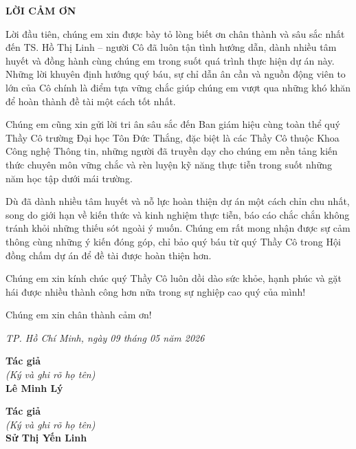 \newpage
\begin{center}
{\fontsize{16pt}{19.2pt}\selectfont \textbf{LỜI CẢM ƠN}\par}
\end{center}
\vspace{0.5cm}

Lời đầu tiên, chúng em xin được bày tỏ lòng biết ơn chân thành và sâu sắc nhất đến TS. Hồ Thị Linh – người Cô đã luôn tận tình hướng dẫn, dành nhiều tâm huyết và đồng hành cùng chúng em trong suốt quá trình thực hiện dự án này. Những lời khuyên định hướng quý báu, sự chỉ dẫn ân cần và nguồn động viên to lớn của Cô chính là điểm tựa vững chắc giúp chúng em vượt qua những khó khăn để hoàn thành đề tài một cách tốt nhất.

Chúng em cũng xin gửi lời tri ân sâu sắc đến Ban giám hiệu cùng toàn thể quý Thầy Cô trường Đại học Tôn Đức Thắng, đặc biệt là các Thầy Cô thuộc Khoa Công nghệ Thông tin, những người đã truyền dạy cho chúng em nền tảng kiến thức chuyên môn vững chắc và rèn luyện kỹ năng thực tiễn trong suốt những năm học tập dưới mái trường.

Dù đã dành nhiều tâm huyết và nỗ lực hoàn thiện dự án một cách chỉn chu nhất, song do giới hạn về kiến thức và kinh nghiệm thực tiễn, báo cáo chắc chắn không tránh khỏi những thiếu sót ngoài ý muốn. Chúng em rất mong nhận được sự cảm thông cùng những ý kiến đóng góp, chỉ bảo quý báu từ quý Thầy Cô trong Hội đồng chấm dự án để đề tài được hoàn thiện hơn.

Chúng em xin kính chúc quý Thầy Cô luôn dồi dào sức khỏe, hạnh phúc và gặt hái được nhiều thành công hơn nữa trong sự nghiệp cao quý của mình!

Chúng em xin chân thành cảm ơn!

\vspace{0.8cm}

\begin{flushright}
\textit{TP. Hồ Chí Minh, ngày 09 tháng 05 năm 2026}
\end{flushright}

\vspace{0.3cm}
\noindent
\begin{minipage}[t]{0.48\textwidth}
    \centering
    \textbf{Tác giả} \\
    \textit{(Ký và ghi rõ họ tên)} \\
    \vspace{2.5cm}
    \textbf{Lê Minh Lý}
\end{minipage}
\hfill
\begin{minipage}[t]{0.48\textwidth}
    \centering
    \textbf{Tác giả} \\
    \textit{(Ký và ghi rõ họ tên)} \\
    \vspace{2.5cm}
    \textbf{Sử Thị Yến Linh}
\end{minipage}